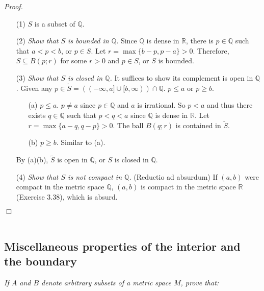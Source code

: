 \documentclass{article}
\begin{document}
\emph{Proof.}
\begin{enumerate}
\item[(1)]
$S$ is a subset of $\mathbb{Q}$.
\item[(2)]
\emph{Show that $S$ is bounded in $\mathbb{Q}$.}
Since $\mathbb{Q}$ is dense in $\mathbb{R}$,
there is $p \in \mathbb{Q}$ such that $a < p < b$, or $p \in S$.
Let $r = \max\{b - p, p - a\} > 0$.
Therefore, $S \subseteq B(p; r)$ for some $r > 0$ and $p \in S$,
or $S$ is bounded.
\item[(3)]
\emph{Show that $S$ is closed in $\mathbb{Q}$.}
It suffices to show its complement is open in $\mathbb{Q}$.
Given any
$p \in \widetilde{S} = ((-\infty, a] \cup [b, \infty)) \cap \mathbb{Q}$.
$p \leq a$ or $p \geq b$.
  \begin{enumerate}
  \item[(a)]
  $p \leq a$. $p \neq a$ since $p \in \mathbb{Q}$ and $a$ is irrational.
  So $p < a$ and thus there exists $q \in \mathbb{Q}$ such that $p < q < a$
  since $\mathbb{Q}$ is dense in $\mathbb{R}$.
  Let $r = \max\{a - q, q - p\} > 0$.
  The ball $B(q; r)$ is contained in $\widetilde{S}$.
  \item[(b)]
  $p \geq b$. Similar to (a).
  \end{enumerate}
  By (a)(b), $\widetilde{S}$ is open in $\mathbb{Q}$, or $S$ is closed in $\mathbb{Q}$.
\item[(4)]
\emph{Show that $S$ is not compact in $\mathbb{Q}$.}
(Reductio ad absurdum)
If $(a,b)$ were compact in the metric space $\mathbb{Q}$,
$(a,b)$ is compact in the metric space $\mathbb{R}$ (Exercise 3.38),
which is absurd.
\end{enumerate}
$\Box$ \\\\






\subsection*{Miscellaneous properties of the interior and the boundary}



\emph{If $A$ and $B$ denote arbitrary subsets of a metric space $M$, prove that:} \\
\end{document}
